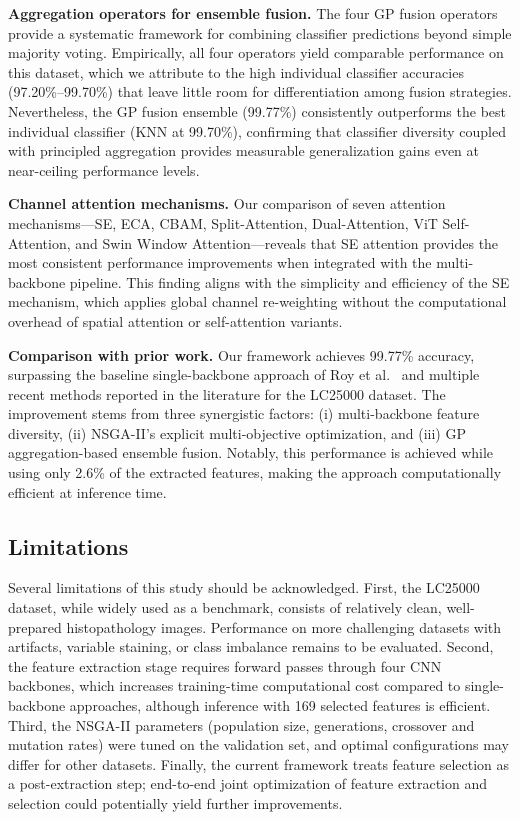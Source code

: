 \documentclass{article}
\begin{document}
\textbf{Aggregation operators for ensemble fusion.}
The four GP fusion operators provide a systematic framework for combining classifier predictions beyond simple majority voting. Empirically, all four operators yield comparable performance on this dataset, which we attribute to the high individual classifier accuracies (97.20\%--99.70\%) that leave little room for differentiation among fusion strategies. Nevertheless, the GP fusion ensemble (99.77\%) consistently outperforms the best individual classifier (KNN at 99.70\%), confirming that classifier diversity coupled with principled aggregation provides measurable generalization gains even at near-ceiling performance levels.

\textbf{Channel attention mechanisms.}
Our comparison of seven attention mechanisms---SE, ECA, CBAM, Split-Attention, Dual-Attention, ViT Self-Attention, and Swin Window Attention---reveals that SE attention provides the most consistent performance improvements when integrated with the multi-backbone pipeline. This finding aligns with the simplicity and efficiency of the SE mechanism, which applies global channel re-weighting without the computational overhead of spatial attention or self-attention variants.

\textbf{Comparison with prior work.}
Our framework achieves 99.77\% accuracy, surpassing the baseline single-backbone approach of Roy et al.~\cite{roy2025grouping} and multiple recent methods reported in the literature for the LC25000 dataset. The improvement stems from three synergistic factors: (i) multi-backbone feature diversity, (ii) NSGA-II's explicit multi-objective optimization, and (iii) GP aggregation-based ensemble fusion. Notably, this performance is achieved while using only 2.6\% of the extracted features, making the approach computationally efficient at inference time.

\subsection{Limitations}

Several limitations of this study should be acknowledged. First, the LC25000 dataset, while widely used as a benchmark, consists of relatively clean, well-prepared histopathology images. Performance on more challenging datasets with artifacts, variable staining, or class imbalance remains to be evaluated. Second, the feature extraction stage requires forward passes through four CNN backbones, which increases training-time computational cost compared to single-backbone approaches, although inference with 169 selected features is efficient. Third, the NSGA-II parameters (population size, generations, crossover and mutation rates) were tuned on the validation set, and optimal configurations may differ for other datasets. Finally, the current framework treats feature selection as a post-extraction step; end-to-end joint optimization of feature extraction and selection could potentially yield further improvements.
\end{document}
